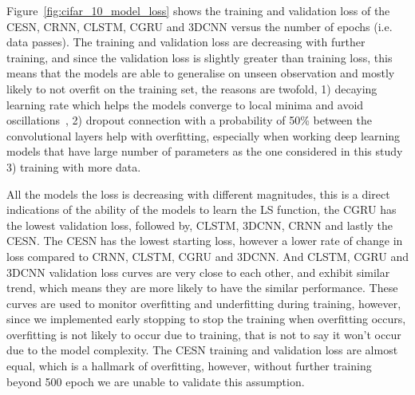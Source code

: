 \documentclass{WitsPhysicsReport}
\begin{document}
\begin{table}[!htb]
    \centering
        \caption{CIFAR-10 dataset optimal parameters for the CESN, CRNN, CLSTM, CGRU and 3DCNN}
    \label{table:cifar_10_hyperparameter}
\end{table}

Figure~\ref{fig:cifar_10_model_loss} shows the training and validation loss of the CESN, CRNN, CLSTM, CGRU and 3DCNN versus the number of epochs (i.e. data passes). The training and validation loss are decreasing with further training, and since the validation loss is slightly greater than training loss, this means that the models are able to generalise on unseen observation and mostly likely to not overfit on the training set, the reasons are twofold, 1) decaying learning rate which helps the models converge to local minima and avoid oscillations~\cite{you2019does}, 2) dropout connection with a probability of 50\% between the convolutional layers help with overfitting, especially when working deep learning models that have large number of parameters as the one considered in this study~\cite{hinton2012improving} 3) training with more data.


All the models the loss is decreasing with different magnitudes, this is a direct indications of the ability of the models to learn the LS function, the CGRU has the lowest validation loss, followed by, CLSTM, 3DCNN, CRNN and lastly the CESN. The CESN has the lowest starting loss, however a lower rate of change in loss compared to CRNN, CLSTM, CGRU and 3DCNN. And CLSTM, CGRU and 3DCNN validation loss curves are very close to each other, and exhibit similar trend, which means they are more likely to have the similar performance. These curves are used to monitor overfitting and underfitting during training, however, since we implemented early stopping to stop the training when overfitting occurs, overfitting is not likely to occur due to training, that is not to say it won't occur due to the model complexity. The CESN training and validation loss are almost equal, which is a hallmark of overfitting, however, without further training beyond 500 epoch we are unable to validate this assumption.
\end{document}
